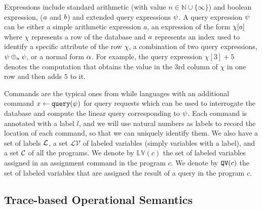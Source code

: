 Expressions include
standard arithmetic (with value $n \in \mathbb{N}\cup \{ \infty \}$) and boolean expression, ($a$ and $b$) and extended query expressions $\psi$.
A query expression $\psi$ can be either a simple arithmetic expression $a$, an expression of the form $\chi[a]$ where $\chi$ represents a row of the database  and  $a$ represents an index used to identify a specific attribute of the row $\chi$, a combination of two query expressions, $\psi \oplus_{a} \psi$, or a normal form $\alpha$.
For example, the query expression $\chi[3] + 5$  denotes the computation that
obtains
the value in the $3$rd column of $\chi$ in one row and then adds $5$ to it.

Commands are the typical ones from while languages with an additional command $\mathrel{ x \leftarrow {\tt query}(\psi) }$ for query requests which can be used to interrogate
 the database and compute the linear query corresponding to $\psi$.
Each command is annotated with a label $l$, and we will use natural numbers as labels to record
the location of each command, so that we can uniquely identify them.
We also have a set of labels $\mathcal{L}$, a set $\mathcal{LV}$  of labeled variables (simply variables with a label), and a set $\mathcal{C}$ of all the programs.
We denote by $\mathbb{LV}(c)$ the set of labeled variables assigned in an assignment command in the program $c$.  
We denote by  $\mathtt{QV}(c)$ the set of labeled variables that are assigned the result of a query in the program $c$.




\subsection{ Trace-based Operational Semantics}

